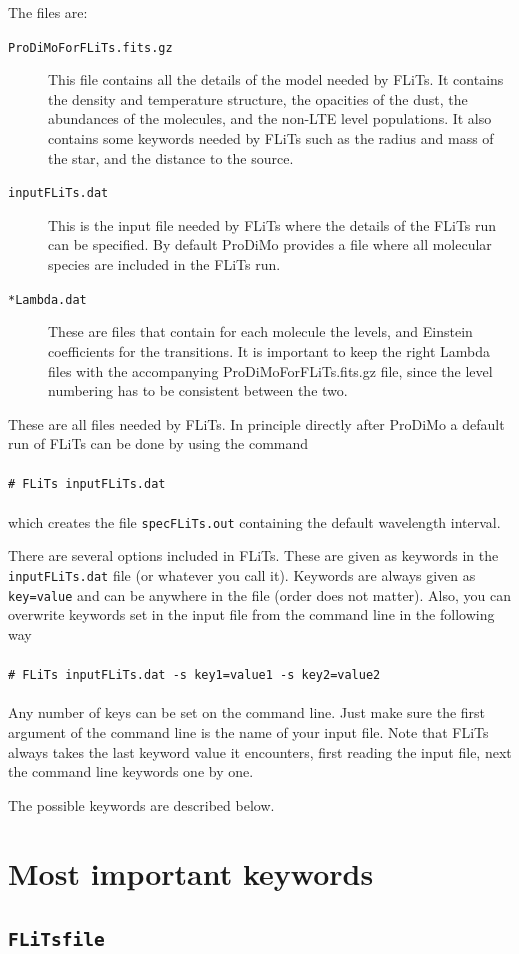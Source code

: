 \documentclass[12pt]{article}
\newcommand{\shellcmd}[1]{\\ \\ \indent\indent\texttt{\# #1}\\ \\ }
\begin{document}
The files are:
\begin{description}
\item[\texttt{ProDiMoForFLiTs.fits.gz}] This file contains all the details of the model needed by FLiTs. It contains the density and temperature structure, the opacities of the dust, the abundances of the molecules, and the non-LTE level populations. It also contains some keywords needed by FLiTs such as the radius and mass of the star, and the distance to the source.
\item[\texttt{inputFLiTs.dat}] This is the input file needed by FLiTs where the details of the FLiTs run can be specified. By default ProDiMo provides a file where all molecular species are included in the FLiTs run.
\item[\texttt{*Lambda.dat}] These are files that contain for each molecule the levels, and Einstein coefficients for the transitions. It is important to keep the right Lambda files with the accompanying ProDiMoForFLiTs.fits.gz file, since the level numbering has to be consistent between the two.
\end{description}

These are all files needed by FLiTs. In principle directly after ProDiMo a default run of FLiTs can be done by using the command
%
\shellcmd{FLiTs inputFLiTs.dat}
%
which creates the file \texttt{specFLiTs.out} containing the default wavelength interval.

There are several options included in FLiTs. These are given as keywords in the \texttt{inputFLiTs.dat} file (or whatever you call it). Keywords are always given as \texttt{key=value} and can be anywhere in the file (order does not matter). Also, you can overwrite keywords set in the input file from the command line in the following way
%
\shellcmd{FLiTs inputFLiTs.dat -s key1=value1 -s key2=value2}
%
Any number of keys can be set on the command line. Just make sure the first argument of the command line is the name of your input file. Note that FLiTs always takes the last keyword value it encounters, first reading the input file, next the command line keywords one by one.

The possible keywords are described below.

\section{Most important keywords}

\subsection*{\texttt{FLiTsfile}}
\end{document}
